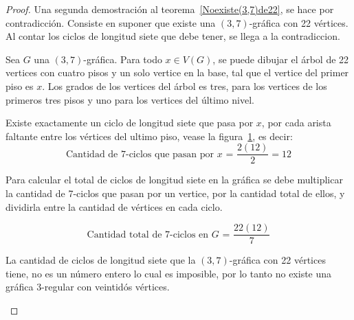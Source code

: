 \documentclass[12pt]{book}
\theoremstyle{definition}
\begin{document}
\begin{proof} Una segunda demostración al teorema~\ref{Noexiste(3,7)de22},
  se hace por contradicción. Consiste en suponer que existe una 
  $(3,7)$-gráfica con 22 vértices. Al contar los ciclos de
  longitud siete que debe tener, se llega a la contradiccion.

Sea $G$ una $(3,7)$-gráfica. Para todo $x\in V(G)$, se
puede dibujar el árbol de 22 vertices con cuatro pisos y un solo
vertice en la base, tal que el
vertice del primer piso es $x$. Los grados de los vertices del árbol
es tres, para los vertices de los primeros tres pisos y uno para los
vertices del último nivel.

Existe exactamente un ciclo de longitud siete que pasa por $x$, por cada
arista faltante entre los vértices del ultimo piso,
vease la figura~\ref{arbol(3,7)contarciclos}, es decir:
\begin{equation*}
\text{Cantidad de 7-ciclos que pasan por $x$ = }\frac{2(12)}{2}=12
\end{equation*}

Para calcular el total de ciclos de longitud siete en la gráfica se
debe multiplicar la cantidad de 7-ciclos que pasan por
un vertice, por la
cantidad total de ellos, y dividirla entre la cantidad de
vértices en cada ciclo.

\begin{equation*}
\text{Cantidad total de 7-ciclos en $G$ = } \frac{22(12)}{7}  
\end{equation*}

La cantidad de ciclos de longitud siete que la $(3,7)$-gráfica con 22
vértices tiene, no es un
número entero lo cual es
imposible, por lo tanto no existe una gráfica $3$-regular con
veintidós vértices.


\begin{figure}
  \centering

  \caption{} \label{arbol(3,7)contarciclos}
\end{figure}

\end{proof}
\end{document}
